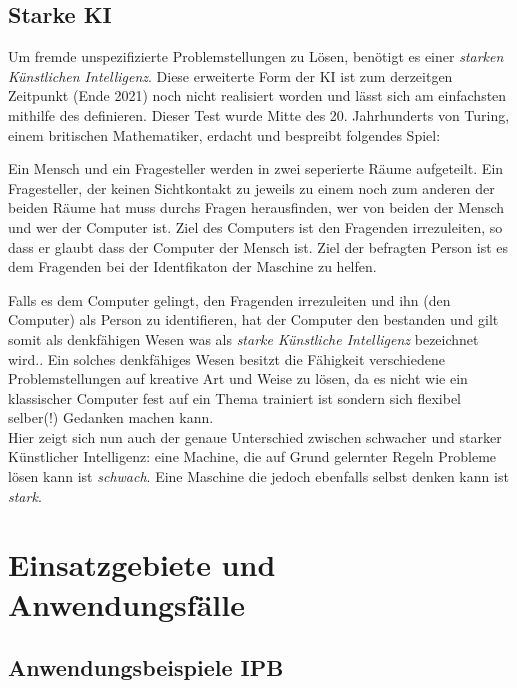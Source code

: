 \documentclass[12pt]{report}
\begin{document}
    \section{Starke KI}
    Um fremde unspezifizierte Problemstellungen zu Lösen, benötigt es einer \emph{starken Künstlichen Intelligenz}.
    Diese erweiterte Form der KI ist zum derzeitgen Zeitpunkt (Ende 2021) noch nicht realisiert worden und lässt sich am
    einfachsten mithilfe des  definieren. Dieser Test wurde Mitte des 20. Jahrhunderts von
    Turing, einem britischen Mathematiker, erdacht und bespreibt folgendes Spiel:
    \begin{displayquote}
        Ein Mensch und ein Fragesteller werden in zwei seperierte
        Räume aufgeteilt. Ein Fragesteller, der keinen Sichtkontakt zu jeweils zu einem noch zum anderen der beiden Räume hat
        muss durchs Fragen herausfinden, wer von beiden der Mensch und wer der Computer ist.
        Ziel des Computers ist den Fragenden irrezuleiten, so dass er glaubt dass der Computer der Mensch ist.
        Ziel der befragten Person ist es dem Fragenden bei der Identfikaton der Maschine zu helfen.\cite{turing1950computing}
    \end{displayquote}
    Falls es dem Computer gelingt, den Fragenden irrezuleiten und ihn (den Computer) als Person zu identifieren, hat der Computer
    den  bestanden und gilt somit als denkfähigen Wesen was als \emph{starke Künstliche Intelligenz}
    bezeichnet wird.\cite{oppy&dowe2020turingtest}. Ein solches denkfähiges Wesen besitzt die Fähigkeit verschiedene Problemstellungen
    auf kreative Art und Weise zu lösen, da es nicht wie ein klassischer Computer fest auf ein Thema trainiert ist sondern
    sich flexibel selber(!) Gedanken machen kann.\\

    Hier zeigt sich nun auch der genaue Unterschied zwischen schwacher und starker Künstlicher Intelligenz: eine Machine,
    die auf Grund gelernter Regeln Probleme lösen kann ist \emph{schwach}. Eine Maschine die jedoch ebenfalls selbst denken
    kann ist \emph{stark}.


    \chapter{Einsatzgebiete und Anwendungsfälle}
    \section{Anwendungsbeispiele IPB}
\end{document}
